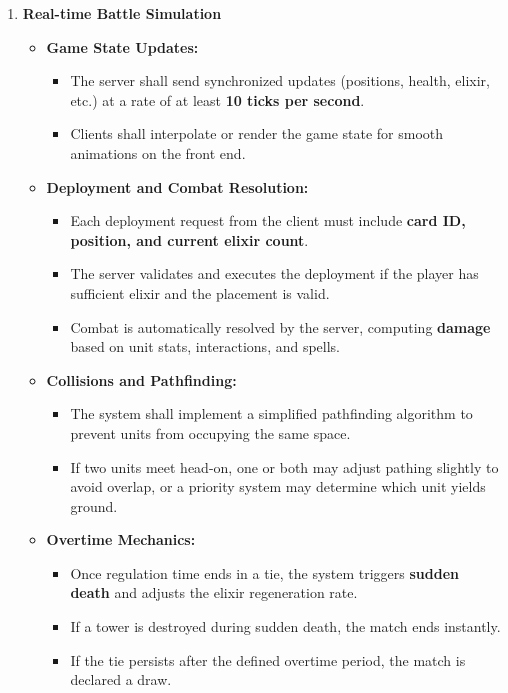 \documentclass{article}
\begin{document}
\begin{enumerate}[label=\textbf{FR\arabic*.}]
\item \textbf{Real-time Battle Simulation}
\begin{itemize}
    \item \textbf{Game State Updates:}
    \begin{itemize}
        \item The server shall send synchronized updates (positions, health, elixir, etc.) at a rate of at least \textbf{10 ticks per second}.
        \item Clients shall interpolate or render the game state for smooth animations on the front end.
    \end{itemize}
    \item \textbf{Deployment and Combat Resolution:}
    \begin{itemize}
        \item Each deployment request from the client must include \textbf{card ID, position, and current elixir count}. 
        \item The server validates and executes the deployment if the player has sufficient elixir and the placement is valid.
        \item Combat is automatically resolved by the server, computing \textbf{damage} based on unit stats, interactions, and spells.
    \end{itemize}
    \item \textbf{Collisions and Pathfinding:}
    \begin{itemize}
        \item The system shall implement a simplified pathfinding algorithm to prevent units from occupying the same space. 
        \item If two units meet head-on, one or both may adjust pathing slightly to avoid overlap, or a priority system may determine which unit yields ground.
    \end{itemize}
    \item \textbf{Overtime Mechanics:}
    \begin{itemize}
        \item Once regulation time ends in a tie, the system triggers \textbf{sudden death} and adjusts the elixir regeneration rate.
        \item If a tower is destroyed during sudden death, the match ends instantly.
        \item If the tie persists after the defined overtime period, the match is declared a draw.
    \end{itemize}
\end{itemize}


\end{enumerate}
\end{document}
